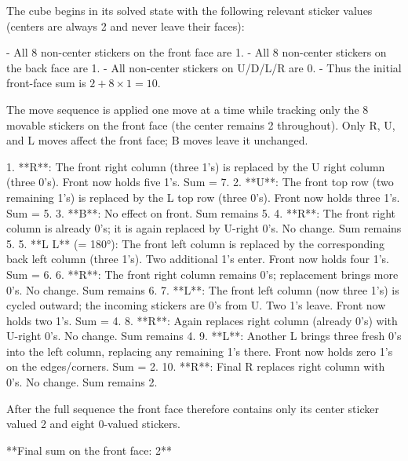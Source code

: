 The cube begins in its solved state with the following relevant sticker values (centers are always 2 and never leave their faces):

- All 8 non-center stickers on the front face are 1.
- All 8 non-center stickers on the back face are 1.
- All non-center stickers on U/D/L/R are 0.
- Thus the initial front-face sum is \(2 + 8 \times 1 = 10\).

The move sequence is applied one move at a time while tracking only the 8 movable stickers on the front face (the center remains 2 throughout). Only R, U, and L moves affect the front face; B moves leave it unchanged.

1. **R**: The front right column (three 1’s) is replaced by the U right column (three 0’s). Front now holds five 1’s. Sum = 7.
2. **U**: The front top row (two remaining 1’s) is replaced by the L top row (three 0’s). Front now holds three 1’s. Sum = 5.
3. **B**: No effect on front. Sum remains 5.
4. **R**: The front right column is already 0’s; it is again replaced by U-right 0’s. No change. Sum remains 5.
5. **L L** (= 180°): The front left column is replaced by the corresponding back left column (three 1’s). Two additional 1’s enter. Front now holds four 1’s. Sum = 6.
6. **R**: The front right column remains 0’s; replacement brings more 0’s. No change. Sum remains 6.
7. **L**: The front left column (now three 1’s) is cycled outward; the incoming stickers are 0’s from U. Two 1’s leave. Front now holds two 1’s. Sum = 4.
8. **R**: Again replaces right column (already 0’s) with U-right 0’s. No change. Sum remains 4.
9. **L**: Another L brings three fresh 0’s into the left column, replacing any remaining 1’s there. Front now holds zero 1’s on the edges/corners. Sum = 2.
10. **R**: Final R replaces right column with 0’s. No change. Sum remains 2.

After the full sequence the front face therefore contains only its center sticker valued 2 and eight 0-valued stickers.

**Final sum on the front face: 2**
